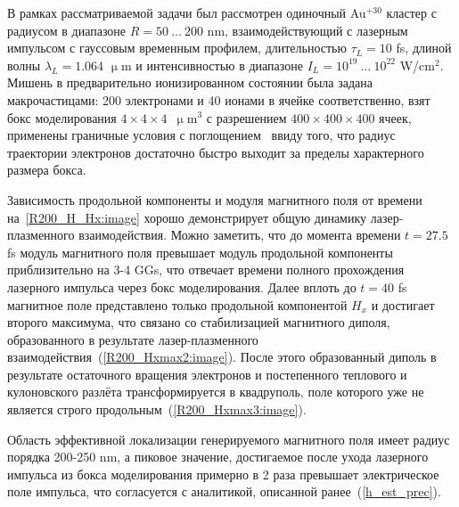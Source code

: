 В рамках рассматриваемой задачи был рассмотрен одиночный Au$^{+30}$ кластер с радиусом в диапазоне $R = 50\:\dots\:200$ nm, взаимодействующий с лазерным импульсом с гауссовым временным профилем, длительностью $\tau_L = 10$ fs, длиной волны $\lambda_L = 1.064$ $\upmu$m и интенсивностью в диапазоне $I_L = 10^{19}\:\dots\:10^{22}$ W/cm$^{2}$. Мишень в предварительно ионизированном состоянии была задана макрочастицами: 200 электронами и 40 ионами в ячейке соответственно, взят бокс моделирования $4\times4\times4$~$\upmu$m$^3$ с разрешением $400\times400\times400$ ячеек, применены граничные условия с поглощением~\cite{cpml2000} ввиду того, что радиус траектории электронов достаточно быстро выходит за пределы характерного размера бокса. 

Зависимость продольной компоненты и модуля магнитного поля от времени на~\autoref{R200_H_Hx:image} хорошо демонстрирует общую динамику лазер-плазменного взаимодействия. Можно заметить, что до момента времени $t = 27.5$ fs модуль магнитного поля превышает модуль продольной компоненты приблизительно на 3-4 GGs, что отвечает времени полного прохождения лазерного импульса через бокс моделирования. Далее вплоть до $t = 40$ fs магнитное поле представлено только продольной компонентой $H_x$ и достигает второго максимума, что связано со стабилизацией магнитного диполя, образованного в результате лазер-плазменного взаимодействия~(\autoref{R200_Hxmax2:image}). После этого образованный диполь в результате остаточного вращения электронов и постепенного теплового и кулоновского разлёта трансформируется в квадруполь, поле которого уже не является строго продольным~(\autoref{R200_Hxmax3:image}).  


Область эффективной локализации генерируемого магнитного поля имеет радиус порядка 200-250 nm, а пиковое значение, достигаемое после ухода лазерного импульса из бокса моделирования примерно в 2 раза превышает электрическое поле импульса, что согласуется с аналитикой, описанной ранее~(\ref{h_est_prec}).



